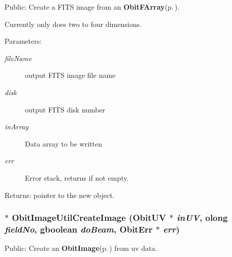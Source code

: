 Public: Create a FITS image from an {\bf Obit\-FArray}{\rm (p.\,\pageref{structObitFArray})}. 

Currently only does two to four dimensions. \begin{Desc}
\item[Parameters:]
\begin{description}
\item[{\em file\-Name}]output FITS image file name \item[{\em disk}]output FITS disk number \item[{\em in\-Array}]Data array to be written \item[{\em err}]Error stack, returns if not empty. \end{description}
\end{Desc}
\begin{Desc}
\item[Returns:]pointer to the new object. \end{Desc}
\subsubsection{$\ast$ Obit\-Image\-Util\-Create\-Image ({\bf Obit\-UV} $\ast$ {\em in\-UV}, {\bf olong} {\em field\-No}, gboolean {\em do\-Beam}, {\bf Obit\-Err} $\ast$ {\em err})}\label{ObitImageUtil_8h_a1}


Public: Create an {\bf Obit\-Image}{\rm (p.\,\pageref{structObitImage})} from uv data. 


